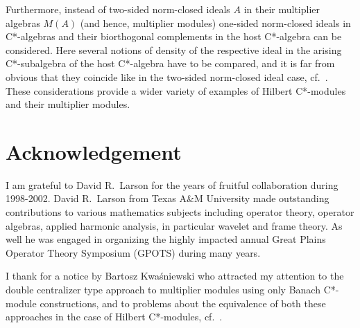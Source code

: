 \documentclass{amsart}
\theoremstyle{definition}
\begin{document}
\medskip 
Furthermore, instead of two-sided norm-closed ideals $A$ in their multiplier algebras $M(A)$ (and hence, multiplier modules) one-sided norm-closed ideals in C*-algebras and their biorthogonal complements in the host C*-algebra can be considered. Here several notions of density of the respective ideal in the arising C*-subalgebra of the host C*-algebra have to be compared, and it is far from obvious that they coincide like in the two-sided norm-closed ideal case, cf.~\cite{Manuilov_2025}. These considerations provide a wider variety of examples of Hilbert C*-modules and their multiplier modules.





\section*{Acknowledgement}
I am grateful to David R.~Larson for the years of fruitful collaboration during 1998-2002.
David R.~Larson from Texas A{\&}M University made outstanding contributions to various mathematics subjects including operator theory, operator algebras, applied harmonic analysis, in particular wavelet and frame theory. As well he was engaged in organizing the highly impacted annual Great Plains Operator Theory Symposium (GPOTS) during many years.

I thank for a notice by Bartosz Kwa\'sniewski who attracted my attention to the double centralizer type approach to multiplier modules using only Banach C*-module constructions, and to problems about the equivalence of both these approaches in the case of Hilbert C*-modules, cf.~\cite{Daws_2010,Daws_2011,BKMS_2024,F_1997,Solel_2001}. 

\end{document}
